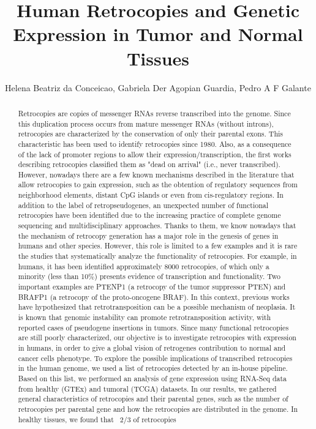 \documentclass[twoside]{article}
\title{\vspace{-15mm}\fontsize{24pt}{10pt}\selectfont\textbf{ Human Retrocopies and Genetic Expression in Tumor and Normal Tissues }} %
\author{ Helena Beatriz da Conceicao, Gabriela Der Agopian Guardia, Pedro A F Galante }
\affil{ IME - USP/ IEP - S\'{\i}rio Liban\^es }
\date{}
\begin{document}
  
  
  \maketitle %
  
  
  \thispagestyle{fancy} %
  
  
  \begin{abstract}
  Retrocopies are copies of messenger RNAs reverse transcribed into the genome. Since this duplication process occurs from mature messenger RNAs (without introns),  retrocopies are characterized by the conservation of only their parental exons. This characteristic has been used to identify retrocopies since 1980. Also,  as a consequence of the lack of promoter regions to allow their expression/transcription,  the first works describing retrocopies classified them as "dead on arrival" (i.e.,  never transcribed). However,  nowadays there are a few known mechanisms described in the literature that allow retrocopies to gain expression,  such as the obtention of regulatory sequences from neighborhood elements,  distant CpG islands or even from cis-regulatory regions. In addition to the label of retropseudogenes,  an unexpected number of functional retrocopies have been identified due to the increasing practice of complete genome sequencing and multidisciplinary approaches. Thanks to them,  we know nowadays that the mechanism of retrocopy generation has a major role in the genesis of genes in humans and other species. However,  this role is limited to a few examples and it is rare the studies that systematically analyze the functionality of retrocopies. For example,  in humans,  it has been identified approximately  8000 retrocopies,  of which only a minority (less than 10\%) presents evidence of transcription and functionality. Two important examples are PTENP1 (a retrocopy of the tumor suppressor PTEN) and BRAFP1 (a retrocopy of the proto-oncogene BRAF). In this context,  previous works have hypothesized that retrotransposition can be a possible mechanism of neoplasia. It is known that genomic instability can promote retrotransposition activity,  with reported cases of pseudogene insertions in tumors. Since many functional retrocopies are still poorly characterized,  our objective is to investigate retrocopies with expression in humans,  in order to give a global vision of retrogenes contribution to normal and cancer cells phenotype. To explore the possible implications of transcribed retrocopies in the human genome,  we used a list of retrocopies detected by an in-house pipeline. Based on this list,  we performed an analysis of gene expression using RNA-Seq data from healthy (GTEx) and tumoral (TCGA) datasets. In our results,  we gathered general characteristics of retrocopies and their parental genes,  such as the number of retrocopies per parental gene and how the retrocopies are distributed in the genome. In healthy tissues,   we found that ~2/3 of retrocopies 
\end{abstract}
\end{document}

